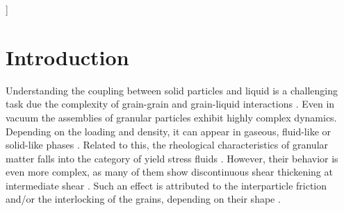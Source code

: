\documentclass[twoside,twocolumn,9pt]{article}
\begin{document}
  ]

\renewcommand*\rmdefault{bch}\normalfont\upshape
\rmfamily
\section*{}
\vspace{-1cm}









\section{Introduction}

Understanding the coupling between solid particles and liquid is a challenging task due the complexity of grain-grain and grain-liquid interactions \cite{zhou2010discrete,zhu2007discrete}. Even in vacuum the assemblies of granular particles exhibit highly complex dynamics. Depending on the loading and density, it can appear in gaseous, fluid-like or solid-like phases \cite{Eshuis2007}. Related to this, the rheological characteristics of granular matter falls into the category of yield stress fluids \cite{Divoux2015,Johnson2017}. However, their behavior is even more complex, as many of them show discontinuous shear thickening at intermediate shear \cite{Seto2013}. Such an effect is attributed to the interparticle friction and/or the interlocking of the grains, depending on their shape \cite{LosertPRE00,Athanassiadis2014, Jaeger2014}.
\end{document}

